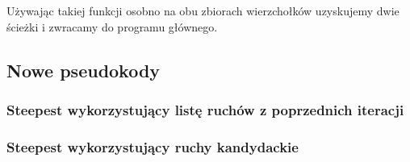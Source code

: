 \documentclass[11pt]{article}
\begin{document}
Używając takiej funkcji osobno na obu zbiorach wierzchołków uzyskujemy dwie ścieżki i zwracamy do programu głównego.

\subsection{Nowe pseudokody}\label{subsec:nowe-pseudokody}

\subsubsection{Steepest wykorzystujący listę ruchów z poprzednich iteracji}



\subsubsection{Steepest wykorzystujący ruchy kandydackie}
\end{document}
